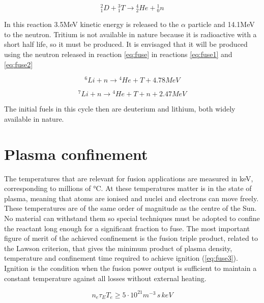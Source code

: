 \begin{equation}
{ }^2_1 D+ { }^3_1T \rightarrow { }^4_2He+{ }^1_0n
\label{eq:fuse}
\end{equation}

In this reaction 3.5MeV kinetic energy is released to the $\alpha$ particle and 14.1MeV to the neutron. Tritium is not available in nature because it is radioactive with a short half life, so it must be produced. It is envisaged that it will be produced using the neutron released in reaction \ref{eq:fuse} in reactions \ref{eq:fuse1} and \ref{eq:fuse2}

\begin{equation}
{}^{6}Li + n \rightarrow {}^{4}He +T +4.78MeV
\label{eq:fuse1}
\end{equation}

\begin{equation}
{}^{7}Li + n \rightarrow {}^{4}He +T +n +2.47MeV
\label{eq:fuse2}
\end{equation}

The initial fuels in this cycle then are deuterium and lithium, both widely available in nature.

\section{Plasma confinement}

The temperatures that are relevant for fusion applications are measured in keV, corresponding to millions of °C. At these temperatures matter is in the state of plasma, meaning that atoms are ionised and nuclei and electrons can move freely. These temperatures are of the same order of magnitude as the centre of the Sun. No material can withstand them so special techniques must be adopted to confine the reactant long enough for a significant fraction to fuse. The most important figure of merit of the achieved confinement is the fusion triple product, related to the Lawson criterion, that gives the minimum product of plasma density, temperature and confinement time required to achieve ignition (\autoref{eq:fuse3}). Ignition is the condition when the fusion power output is sufficient to maintain a constant temperature against all losses without external heating.

\begin{equation}
{n_e} {\tau }_{E} T_e  \geq  5\cdot{10}^{21}{ m }^{ -3 }\,s\,keV
\label{eq:fuse3}
\end{equation}

